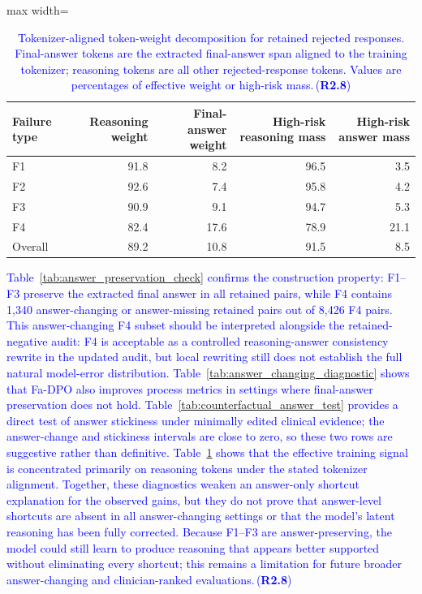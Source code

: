 \documentclass[a4paper,fleqn,doubleblind]{cas-sc}
\DeclareRobustCommand{\added}[1]{\textcolor{blue}{#1}}
\DeclareRobustCommand{\revtag}[1]{\textcolor{blue}{\scriptsize\,(\textbf{#1})}}
\begin{document}
\begin{table}[htbp]
    \centering
    \begingroup\color{blue}
    \footnotesize
    \caption{\added{Tokenizer-aligned token-weight decomposition for retained rejected responses. Final-answer tokens are the extracted final-answer span aligned to the training tokenizer; reasoning tokens are all other rejected-response tokens. Values are percentages of effective weight or high-risk mass.}\revtag{R2.8}}
    \label{tab:answer_token_weight_decomposition}
    \begin{adjustbox}{max width=\textwidth}
    \begin{tabular}{lrrrr}
        \toprule
        \textbf{Failure type} & \textbf{Reasoning weight} & \textbf{Final-answer weight} & \textbf{High-risk reasoning mass} & \textbf{High-risk answer mass} \\
        \midrule
        F1 & 91.8 & 8.2 & 96.5 & 3.5 \\
        F2 & 92.6 & 7.4 & 95.8 & 4.2 \\
        F3 & 90.9 & 9.1 & 94.7 & 5.3 \\
        F4 & 82.4 & 17.6 & 78.9 & 21.1 \\
        \midrule
        Overall & 89.2 & 10.8 & 91.5 & 8.5 \\
        \bottomrule
    \end{tabular}
    \end{adjustbox}
    \endgroup
\end{table}

\added{Table~\ref{tab:answer_preservation_check} confirms the construction property: F1--F3 preserve the extracted final answer in all retained pairs, while F4 contains 1,340 answer-changing or answer-missing retained pairs out of 8,426 F4 pairs. This answer-changing F4 subset should be interpreted alongside the retained-negative audit: F4 is acceptable as a controlled reasoning-answer consistency rewrite in the updated audit, but local rewriting still does not establish the full natural model-error distribution. Table~\ref{tab:answer_changing_diagnostic} shows that Fa-DPO also improves process metrics in settings where final-answer preservation does not hold. Table~\ref{tab:counterfactual_answer_test} provides a direct test of answer stickiness under minimally edited clinical evidence; the answer-change and stickiness intervals are close to zero, so these two rows are suggestive rather than definitive. Table~\ref{tab:answer_token_weight_decomposition} shows that the effective training signal is concentrated primarily on reasoning tokens under the stated tokenizer alignment. Together, these diagnostics weaken an answer-only shortcut explanation for the observed gains, but they do not prove that answer-level shortcuts are absent in all answer-changing settings or that the model's latent reasoning has been fully corrected. Because F1--F3 are answer-preserving, the model could still learn to produce reasoning that appears better supported without eliminating every shortcut; this remains a limitation for future broader answer-changing and clinician-ranked evaluations.}\revtag{R2.8}
\end{document}
